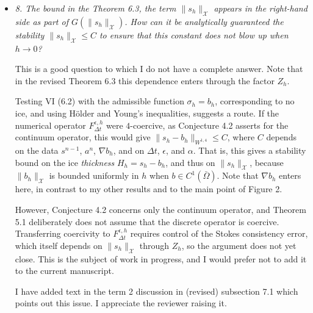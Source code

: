 \documentclass[11pt,reqno]{amsart}
\newcommand{\cX}{\mathcal{X}}
\newcommand{\grad}{\nabla}
\newcommand{\eps}{\epsilon}
\newcommand{\reply}[2]{%
\medskip
\item \emph{#1}

\medskip
\noindent #2
}
\begin{document}
\begin{itemize}[itemindent=0mm, labelsep=5mm]
\reply{8. The bound in the Theorem 6.3, the term $\|s_h\|_{\cX}$ appears in the right-hand side as part of $G(\|s_h\|_{\cX})$. How can it be analytically guaranteed the stability $\|s_h\|_{\cX} \le C$ to ensure that this constant does not blow up when $h\to 0$?}
{This is a good question to which I do not have a complete answer.  Note that in the revised Theorem 6.3 this dependence enters through the factor $Z_h$. \par
Testing VI (6.2) with the admissible function $\sigma_h=b_h$, corresponding to no ice, and using H\"older and Young's inequalities, suggests a route.  If the numerical operator $F^{\eps,h}_{\Delta t}$ were $4$-coercive, as Conjecture 4.2 asserts for the continuum operator, this would give $\|s_h-b_h\|_{W^{1,4}} \le C$, where $C$ depends on the data $s^{n-1}$, $a^n$, $\grad b_h$, and on $\Delta t$, $\eps$, and $\alpha$.  That is, this gives a stability bound on the ice \emph{thickness} $H_h=s_h-b_h$, and thus on $\|s_h\|_\cX$, because $\|b_h\|_\cX$ is bounded uniformly in $h$ when $b\in C^1(\bar\Omega)$.  Note that $\grad b_h$ enters here, in contrast to my other results and to the main point of Figure 2. \par
However, Conjecture 4.2 concerns only the continuum operator, and Theorem 5.1 deliberately does not assume that the discrete operator is coercive.  Transferring coercivity to $F^{\eps,h}_{\Delta t}$ requires control of the Stokes consistency error, which itself depends on $\|s_h\|_\cX$ through $Z_h$, so the argument does not yet close.  This is the subject of work in progress, and I would prefer not to add it to the current manuscript. \par
I have added text in the term 2 discussion in (revised) subsection 7.1 which points out this issue.  I appreciate the reviewer raising it.}


\end{itemize}
\end{document}
